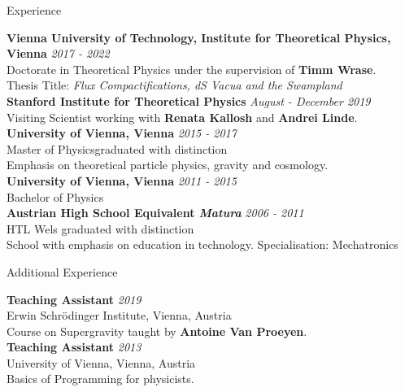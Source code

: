 \documentclass[a4paper]{resume} %
\begin{document}

\begin{rSection}{Experience}

{\bf Vienna University of Technology, Institute for Theoretical Physics, Vienna} \hfill {\em 2017 - 2022} 
\\ Doctorate in Theoretical Physics under the supervision of {\bf Timm Wrase}.
\\ Thesis Title: \emph{Flux Compactifications, dS Vacua and the Swampland}\vspace{7pt}
\\{\bf Stanford Institute for Theoretical Physics} \hfill {\em August - December 2019}
\\ Visiting Scientist working with {\bf Renata Kallosh} and {\bf Andrei Linde}.
\vspace{7pt}
\\{\bf University of Vienna, Vienna} \hfill {\em 2015 - 2017} 
\\ Master of Physics\hfill {graduated with distinction }
\\ Emphasis on theoretical particle physics, gravity and cosmology.\vspace{7pt}
\\ {\bf University of Vienna, Vienna} \hfill {\em 2011 - 2015}
\\ Bachelor of Physics \vspace{7pt}
\\ {\bf Austrian High School Equivalent \emph{Matura}} \hfill {\em 2006 - 2011}
\\ HTL Wels \hfill {graduated with distinction}
\\ School with emphasis on education in technology. Specialisation: Mechatronics

\end{rSection}


\begin{rSection}{Additional Experience}

{\bf Teaching Assistant} \hfill {\em 2019}
\\ Erwin Schrödinger Institute, Vienna, Austria
\\ Course on Supergravity taught by {\bf Antoine Van Proeyen}.\vspace{7pt}
\\{\bf Teaching Assistant} \hfill {\em 2013}
\\ University of Vienna, Vienna, Austria
\\ Basics of Programming for physicists.

\end{rSection}
\end{document}

